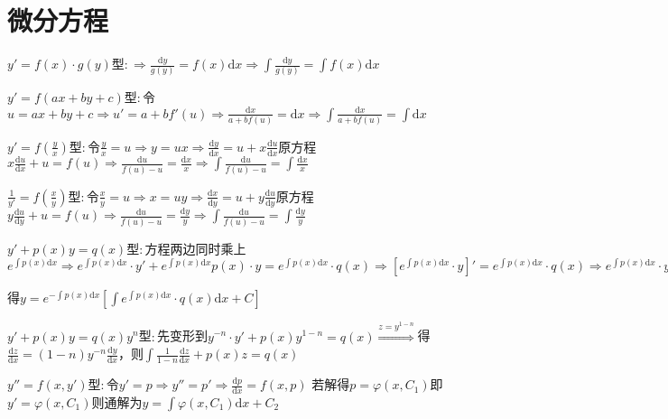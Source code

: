 \section{微分方程}

\begin{spacing}{\hangju}
    $ y' = f(x) \cdot g(y)$型$\displaystyle \colon \Rightarrow \frac{\mathrm{d}y}{g(y)} = f(x)\mathrm{d}x \Rightarrow \int{\frac{\mathrm{d}y}{g(y)}} = \int{f(x)}\mathrm{d}x $

    $y' = f(ax + by + c)$型$\colon$令$\displaystyle u = ax +by + c \Rightarrow u' = a + bf'(u) \Rightarrow \frac{\mathrm{d}x}{a + bf(u)} = \mathrm{d}x \Rightarrow \int{\frac{\mathrm{d}x}{a + bf(u)}} = \int\mathrm{d}x$

    $y' = f(\frac{y}{x})$型$\colon$令$\frac{y}{x} = u \Rightarrow y = ux \Rightarrow \frac{\mathrm{d}y}{\mathrm{d}x} = u + x\frac{\mathrm{d}u}{\mathrm{d}x}$原方程$\displaystyle x\frac{\mathrm{d}u}{\mathrm{d}x} + u = f(u) \Rightarrow \frac{\mathrm{d}u}{f(u)-u} = \frac{\mathrm{d}x}{x} \Rightarrow \int{\frac{\mathrm{d}u}{f(u)-u}} = \int{\frac{\mathrm{d}x}{x}}$

    $\frac{1}{y'} = f(\frac{x}{y})$型$\colon$令$\frac{x}{y} = u \Rightarrow x = uy \Rightarrow \frac{\mathrm{d}x}{\mathrm{d}y} = u + y\frac{\mathrm{d}u}{\mathrm{d}y}$原方程$\displaystyle y\frac{\mathrm{d}u}{\mathrm{d}y} + u = f(u) \Rightarrow \frac{\mathrm{d}u}{f(u)-u} = \frac{\mathrm{d}y}{y} \Rightarrow \int{\frac{\mathrm{d}u}{f(u)-u}} = \int{\frac{\mathrm{d}y}{y}}$

    $y' + p(x)y = q(x)$型$\colon$方程两边同时乘上$\displaystyle e^{\int{p(x)\mathrm{d}x}} \Rightarrow e^{\int{p(x)\mathrm{d}x}} \cdot y' + e^{\int{p(x)\mathrm{d}x}}p(x) \cdot y = e^{\int{p(x)\mathrm{d}x}} \cdot q(x) \Rightarrow \left[e^{\int{p(x)\mathrm{d}x}} \cdot y\right]' = e^{\int{p(x)\mathrm{d}x}} \cdot q(x) \Rightarrow e^{\int{p(x)\mathrm{d}x}} \cdot y = \int{e^{\int{p(x)\mathrm{d}x}} \cdot q(x)}\mathrm{d}x + C$

    \noindent 得$\displaystyle y = e^{-\int{p(x)\mathrm{d}x}}\left[\int{e^{\int{p(x)\mathrm{d}x}} \cdot q(x)\mathrm{d}x} + C\right]$

    \noindent $y' + p(x)y = q(x)y^n$型$\colon$先变形到$y^{-n} \cdot y' + p(x)y^{1-n} = q(x) \stackrel{z = y^{1-n}}{\Longrightarrow}$得$\frac{\mathrm{d}z}{\mathrm{d}x} = (1 - n)y^{-n}\frac{\mathrm{d}y}{\mathrm{d}x}$，则$\displaystyle \int \frac{1}{1 - n}\frac{\mathrm{d}z}{\mathrm{d}x} + p(x)z = q(x)$

    \noindent $y''=f(x, y')$型$\colon$令$y' = p \Rightarrow y'' = p' \Rightarrow \frac{\mathrm{d}p}{\mathrm{d}x} = f(x, p)$
    若解得$p = \varphi(x, C_1)$即$y' = \varphi(x, C_1)$则通解为$\displaystyle y = \int{\varphi(x, C_1)\mathrm{d}x} +C_2$


\end{spacing}
